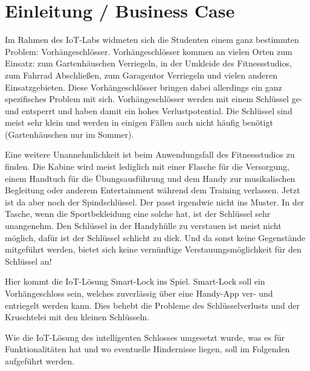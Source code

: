 
\chapter{Einleitung / Business Case}
Im Rahmen des \ac{IoT}-Labs widmeten sich die Studenten einem ganz bestimmten Problem: Vorhängeschlösser. Vorhängeschlösser kommen an vielen Orten zum Einsatz: zum Gartenhäuschen Verriegeln, in der Umkleide des Fitnessstudios, zum Fahrrad Abschließen, zum Garagentor Verriegeln und vielen anderen Einsatzgebieten. Diese Vorhängeschlösser bringen dabei allerdings ein ganz spezifisches Problem mit sich. Vorhängeschlösser werden mit einem Schlüssel ge- und entsperrt und haben damit ein hohes Verlustpotential. Die Schlüssel sind meist sehr klein und werden in einigen Fällen auch nicht häufig benötigt (Gartenhäuschen nur im Sommer).

Eine weitere Unannehmlichkeit ist beim Anwendungsfall des Fitnessstudios zu finden. Die Kabine wird meist lediglich mit einer Flasche für die Versorgung, einem Handtuch für die Übungsausführung und dem Handy zur musikalischen Begleitung oder anderem Entertainment während dem Training verlassen. Jetzt ist da aber noch der Spindschlüssel. Der passt irgendwie nicht ins Muster. In der Tasche, wenn die Sportbekleidung eine solche hat, ist der Schlüssel sehr unangenehm. Den Schlüssel in der Handyhülle zu verstauen ist meist nicht möglich, dafür ist der Schlüssel schlicht zu dick. Und da sonst keine Gegenstände mitgeführt werden, bietet sich keine vernünftige Verstauungsmöglichkeit für den Schlüssel an! 

Hier kommt die \ac{IoT}-Lösung Smart-Lock ins Spiel. Smart-Lock soll ein Vorhängeschloss sein, welches zuverlässig über eine Handy-App ver- und entriegelt werden kann. Dies behebt die Probleme des Schlüsselverlusts und der \glqq Kruschtelei\grqq{} mit den kleinen Schlüsseln.

Wie die \ac{IoT}-Lösung des intelligenten Schlosses umgesetzt wurde, was es für Funktionalitäten hat und wo eventuelle Hindernisse liegen, soll im Folgenden aufgeführt werden.